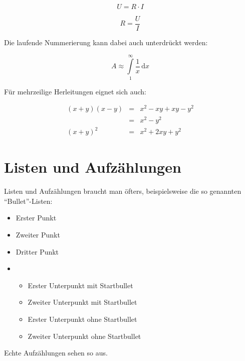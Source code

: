 \begin{equation}
U=R\cdot I
\label{formel:ohm}
\end{equation}

\begin{equation}
R=\frac{U}{I}
\end{equation}

Die laufende Nummerierung kann dabei auch unterdrückt werden:

\begin{displaymath}
A\approx\int\limits_{1}^{\infty}\frac{1}{x}\,\mathrm{d}x
\end{displaymath}

Für mehrzeilige Herleitungen eignet sich auch:

\begin{eqnarray}
(x+y)(x-y) & = & x^2-xy+xy-y^2 \\
& = & x^2 - y^2 \\
(x+y)^2 & = & x^2+2xy+y^2
\end{eqnarray}



\section{Listen und Aufzählungen}
Listen und Aufzählungen braucht man öfters, beispielsweise
die so genannten "`Bullet"'-Listen:

\begin{itemize}
\item Erster Punkt
\item Zweiter Punkt
\item Dritter Punkt
\item \begin{itemize}
      \item Erster Unterpunkt mit Startbullet
      \item Zweiter Unterpunkt mit Startbullet
      \end{itemize}
      \begin{itemize}
      \item Erster Unterpunkt ohne Startbullet
      \item Zweiter Unterpunkt ohne Startbullet
      \end{itemize}

\end{itemize}

Echte Aufzählungen sehen so aus.

